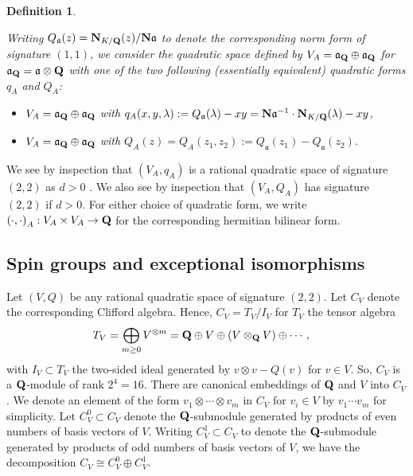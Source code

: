 \documentclass{amsart}
\newtheorem{definition}[theorem]{Definition}
\theoremstyle{definition}
\begin{document}
\begin{definition}\label{V_A}

Writing $Q_{\mathfrak{a}}(z) = {\bf{N}}_{K/{\bf{Q}}}(z)/{\bf{N}} \mathfrak{a}$ to denote the corresponding 
norm form of signature $(1,1)$, we consider the quadratic space defined by 
$V_A =  \mathfrak{a}_{\bf{Q}} \oplus \mathfrak{a}_{\bf{Q}}$ 
for $\mathfrak{a}_{\bf{Q}} = \mathfrak{a} \otimes {\bf{Q}}$ with one of the two following (essentially equivalent) quadratic forms $q_A$ and $Q_A$:

\begin{itemize}

\item[(i)] $V_A = \mathfrak{a}_{\bf{Q}} \oplus \mathfrak{a}_{\bf{Q}}$ 
with $q_A(x, y, \lambda) := Q_{\mathfrak{a}}(\lambda) - xy = {\bf{N}} \mathfrak{a}^{-1} \cdot {\bf{N}}_{K/{\bf{Q}}}(\lambda) - xy$,

\item[(ii)] $V_A = \mathfrak{a}_{\bf{Q}} \oplus \mathfrak{a}_{\bf{Q}}$ 
with $Q_A(z) = Q_A(z_1, z_2) := Q_{\mathfrak{a}}(z_1) - Q_{\mathfrak{a}}(z_2)$.

\end{itemize}

\end{definition}

We see by inspection that $(V_A, q_A)$ is a rational quadratic space of signature $(2, 2)$ as $d >0$ .
We also see by inspection that $(V_A, Q_A)$ has signature $(2,2)$ if $d > 0$.
For either choice of quadratic form, we write  
$\left(  \cdot, \cdot \right)_A : V_A \times V_A \rightarrow {\bf{Q}}$ for the corresponding hermitian bilinear form.

\subsection{Spin groups and exceptional isomorphisms} 

Let $(V, Q)$ be any rational quadratic space of signature $(2,2)$.
Let $C_V$ denote the corresponding Clifford algebra. Hence, $C_V = T_V/I_V$ for $T_V$ the tensor algebra
\begin{align*} T_V &= \bigoplus_{m \geq 0} V^{\otimes m} = {\bf{Q}} \oplus V \oplus (V \otimes_{\bf{Q}} V) \oplus \cdots, \end{align*}
with $I_V \subset T_V$ the two-sided ideal generated by $v \otimes v - Q(v)$ for $v \in V$. 
So, $C_V$ is a ${\bf{Q}}$-module of rank $2^4 = 16$. There are canonical embeddings of ${\bf{Q}}$ and $V$ into $C_V$. 
We denote an element of the form $v_1 \otimes \cdots \otimes v_m$ in $C_V$ for $v_i \in V$ by $v_1 \cdots v_m$ for simplicity. 
Let $C_V^0 \subset C_V$ denote the ${\bf{Q}}$-submodule generated by products of even numbers of basis vectors of $V$.
Writing $C_V^1 \subset C_V$ to denote the ${\bf{Q}}$-submodule generated by products of odd numbers of basis 
vectors of $V$, we have the decomposition $C_V \cong C_V^0 \oplus C_V^1$. 
\end{document}

